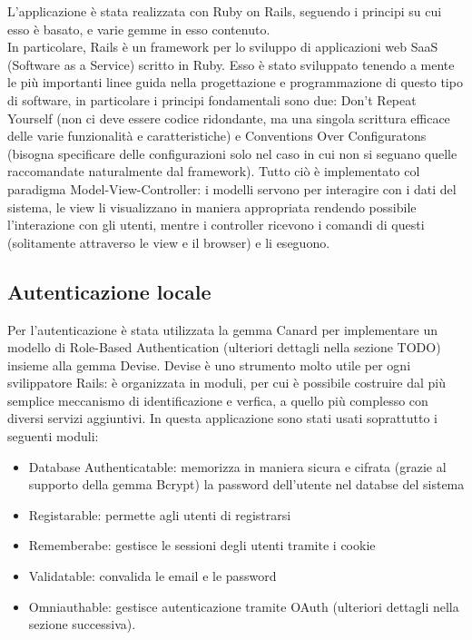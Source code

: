 \documentclass[Lau, binding=0.6cm]{sapthesis}
\begin{document}
L’applicazione è stata realizzata con Ruby on Rails, seguendo i principi su cui esso è basato, e varie gemme in esso contenuto.\\
In particolare, Rails è un framework per lo sviluppo di applicazioni web SaaS (Software as a Service) scritto in Ruby. Esso è stato sviluppato tenendo a mente le più importanti linee guida nella progettazione e programmazione di questo tipo di software, in particolare i principi fondamentali sono due: Don’t Repeat Yourself (non ci deve essere codice ridondante, ma una singola scrittura efficace delle varie funzionalità e caratteristiche) e Conventions Over Configuratons (bisogna specificare delle configurazioni solo nel caso in cui non si seguano quelle raccomandate naturalmente dal framework).
Tutto ciò è implementato col paradigma Model-View-Controller: i modelli servono per interagire con i dati del sistema, le view li visualizzano in maniera appropriata rendendo possibile l’interazione con gli utenti, mentre i controller ricevono i comandi di questi (solitamente attraverso le view e il browser) e li eseguono.

\subsection{Autenticazione locale}

Per l’autenticazione è stata utilizzata la gemma Canard per implementare un modello di Role-Based Authentication (ulteriori dettagli nella sezione TODO) insieme alla gemma Devise.
Devise è uno strumento molto utile per ogni svilippatore Rails: è organizzata in moduli, per cui è possibile costruire dal più semplice meccanismo di identificazione e verfica, a quello più complesso con diversi servizi aggiuntivi. In questa applicazione sono stati usati soprattutto i seguenti moduli:

\begin{itemize}
	\item Database Authenticatable: memorizza in maniera sicura e cifrata (grazie al supporto della gemma Bcrypt) la password dell’utente nel databse del sistema
	\item Registarable: permette agli utenti di registrarsi
	\item Rememberabe: gestisce le sessioni degli utenti tramite i cookie
	\item Validatable: convalida le email e le password
	\item Omniauthable: gestisce autenticazione tramite OAuth (ulteriori dettagli nella sezione successiva).
\end{itemize}
\end{document}
